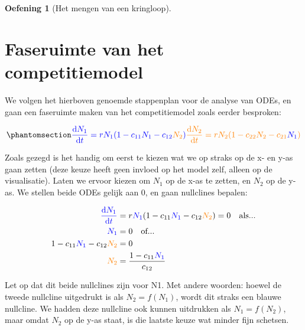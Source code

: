 \documentclass[
  a4paper,
]{scrbook}
\theoremstyle{definition}
\newtheorem{exercise}{Oefening}[chapter]
\theoremstyle{remark}
\begin{document}
\begin{exercise}[Het mengen van een
kringloop]
\begin{tcolorbox}
\end{tcolorbox}

\section{Faseruimte van het
competitiemodel}\label{faseruimte-van-het-competitiemodel}

We volgen het hierboven genoemde stappenplan voor de analyse van ODEs,
en gaan een faseruimte maken van het competitiemodel zoals eerder
besproken:

\begin{equation}\phantomsection\label{eq-soorten}{
\color{blue} \mathchoice{\frac{\mathrm{d}N_1}
{\mathrm{d}t}}{\mathrm{d}N_1/\mathrm{d}t}
{\mathrm{d}N_1/\mathrm{d}t}
{\mathrm{d}N_1/\mathrm{d}t} = r\textcolor{blue}{N_1}(1 - c_{11}\textcolor{blue}{N_1} - c_{12}\textcolor{orange}{N_2})\\
\color{orange}\mathchoice{\frac{\mathrm{d}N_2}
{\mathrm{d}t}}{\mathrm{d}N_2/\mathrm{d}t}
{\mathrm{d}N_2/\mathrm{d}t}
{\mathrm{d}N_2/\mathrm{d}t} = r\textcolor{orange}{N_2}(1 - c_{22}\textcolor{orange}{N_2} - c_{21}\textcolor{blue}{N_1})
}\end{equation}

Zoals gezegd is het handig om eerst te kiezen wat we op straks op de x-
en y-as gaan zetten (deze keuze heeft geen invloed op het model zelf,
alleen op de visualisatie). Laten we ervoor kiezen om \(N_1\) op de x-as
te zetten, en \(N_2\) op de y-as. We stellen beide ODEs gelijk aan 0, en
gaan nullclines bepalen:

\begin{align*}
\color{blue} \mathchoice{\frac{\mathrm{d}N_1}
{\mathrm{d}t}}{\mathrm{d}N_1/\mathrm{d}t}
{\mathrm{d}N_1/\mathrm{d}t}
{\mathrm{d}N_1/\mathrm{d}t} &= r\textcolor{blue}{N_1}(1 - c_{11}\textcolor{blue}{N_1} - c_{12}\textcolor{orange}{N_2}) = 0  \quad \text{als...} \\
\textcolor{blue}{N_1} &= 0 \quad \text{of...} \\
1 - c_{11}\textcolor{blue}{N_1} - c_{12}\textcolor{orange}{N_2} &= 0 \\
 \textcolor{orange}{N_2} &= \frac{1 - c_{11}\textcolor{blue}{N_1}}{c_{12}}
\end{align*}

Let op dat dit beide nullclines zijn voor {N1}. Met andere woorden:
hoewel de tweede nullcline uitgedrukt is als \(N_2=f(N_1)\), wordt dit
straks een {blauwe} nullcline. We hadden deze nullcline ook kunnen
uitdrukken als \(N_1=f(N_2)\), maar omdat \(N_2\) op de y-as staat, is
die laatste keuze wat minder fijn schetsen.


\end{exercise}
\end{document}

